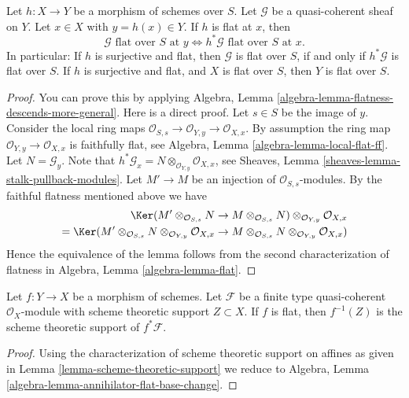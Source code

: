 \begin{lemma}
\label{lemma-flat-permanence}
Let $h : X \to Y$ be a morphism of schemes over $S$.
Let $\mathcal{G}$ be a quasi-coherent sheaf on $Y$.
Let $x \in X$ with $y = h(x) \in Y$. If $h$ is flat at $x$, then
$$
\mathcal{G}\text{ flat over }S\text{ at }y
\Leftrightarrow
h^*\mathcal{G}\text{ flat over }S\text{ at }x.
$$
In particular: If $h$ is surjective and flat, then
$\mathcal{G}$ is flat over $S$, if and only if
$h^*\mathcal{G}$ is flat over $S$. If $h$ is surjective and
flat, and $X$ is flat over $S$, then $Y$ is flat over $S$.
\end{lemma}

\begin{proof}
You can prove this by applying
Algebra, Lemma \ref{algebra-lemma-flatness-descends-more-general}.
Here is a direct proof. Let $s \in S$ be the image of $y$.
Consider the local ring maps
$\mathcal{O}_{S, s} \to \mathcal{O}_{Y, y} \to \mathcal{O}_{X, x}$.
By assumption the ring map $\mathcal{O}_{Y, y} \to \mathcal{O}_{X, x}$
is faithfully flat, see
Algebra, Lemma \ref{algebra-lemma-local-flat-ff}.
Let $N = \mathcal{G}_y$. Note that
$h^*\mathcal{G}_x = N \otimes_{\mathcal{O}_{Y, y}} \mathcal{O}_{X, x}$, see
Sheaves, Lemma \ref{sheaves-lemma-stalk-pullback-modules}.
Let $M' \to M$ be an injection of $\mathcal{O}_{S, s}$-modules.
By the faithful flatness mentioned above we have
\begin{align*}
\Ker(
M' \otimes_{\mathcal{O}_{S, s}} N \to M \otimes_{\mathcal{O}_{S, s}} N)
\otimes_{\mathcal{O}_{Y, y}} \mathcal{O}_{X, x} \\
=
\Ker(
M' \otimes_{\mathcal{O}_{S, s}} N
\otimes_{\mathcal{O}_{Y, y}} \mathcal{O}_{X, x}
\to
M \otimes_{\mathcal{O}_{S, s}} N
\otimes_{\mathcal{O}_{Y, y}} \mathcal{O}_{X, x})
\end{align*}
Hence the equivalence of the lemma follows from the second characterization
of flatness in
Algebra, Lemma \ref{algebra-lemma-flat}.
\end{proof}

\begin{lemma}
\label{lemma-flat-pullback-support}
Let $f : Y \to X$ be a morphism of schemes. Let $\mathcal{F}$ be
a finite type quasi-coherent $\mathcal{O}_X$-module with scheme
theoretic support $Z \subset X$. If $f$ is flat,
then $f^{-1}(Z)$ is the scheme theoretic support of $f^*\mathcal{F}$.
\end{lemma}

\begin{proof}
Using the characterization of scheme theoretic support on affines
as given in Lemma \ref{lemma-scheme-theoretic-support} we reduce to
Algebra, Lemma \ref{algebra-lemma-annihilator-flat-base-change}.
\end{proof}

